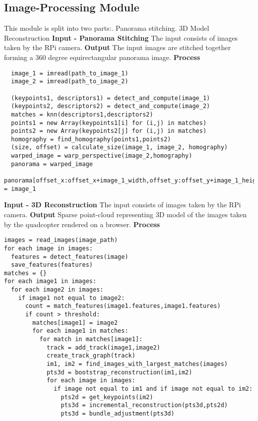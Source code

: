 \subsection{Image-Processing Module}
\noindent
This module is split into two parts:. Panorama stitching. 3D Model Reconstruction\newline
\newline
\textbf{Input - Panorama Stitching}\newline
The input consists of images taken by the RPi camera.\newline
\newline
\textbf{Output}\newline
The input images are stitched together forming a 360 degree equirectangular panorama image.\newline
\newline \newline
\textbf{Process}
\begin{lstlisting}
  image_1 = imread(path_to_image_1)
  image_2 = imread(path_to_image_2)

  (keypoints1, descriptors1) = detect_and_compute(image_1)
  (keypoints2, descriptors2) = detect_and_compute(image_2)
  matches = knn(descriptors1,descriptors2)
  points1 = new Array(keypoints1[i] for (i,j) in matches)
  points2 = new Array(keypoints2[j] for (i,j) in matches)
  homography = find_homography(points1,points2)
  (size, offset) = calculate_size(image_1, image_2, homography)
  warped_image = warp_perspective(image_2,homography)
  panorama = warped_image
  panorama[offset_x:offset_x+image_1_width,offset_y:offset_y+image_1_height] = image_1
\end{lstlisting}
\textbf{Input - 3D Reconstruction}\newline
The input consists of images taken by the RPi camera.\newline \newline
\textbf{Output}\newline
Sparse point-cloud representing 3D model of the images taken by the quadcopter rendered on a browser.\newline \newline
\textbf{Process}
\begin{lstlisting}
images = read_images(image_path)
for each image in images:
  features = detect_features(image)
  save_features(features)
matches = {}
for each image1 in images:
  for each image2 in images:
    if image1 not equal to image2:
      count = match_features(image1.features,image1.features)
      if count > threshold:
        matches[image1] = image2
        for each image1 in matches:
          for match in matches[image1]:
            track = add_track(image1,image2)
            create_track_graph(track)
            im1, im2 = find_images_with_largest_matches(images)
            pts3d = bootstrap_reconstruction(im1,im2)
            for each image in images:
              if image not equal to im1 and if image not equal to im2:
                pts2d = get_keypoints(im2)
                pts3d = incremental_reconstruction(pts3d,pts2d)
                pts3d = bundle_adjustment(pts3d)
\end{lstlisting}


